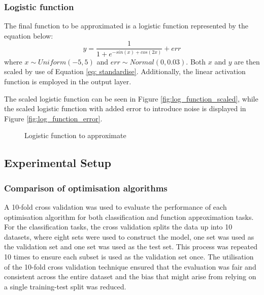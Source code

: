 \documentclass[10pt, conference]{IEEEtran}
\begin{document}
\subsubsection{Logistic function}

The final function to be approximated is a logistic function represented by the equation below:
\begin{equation}
    y = \frac{1}{1+e^{-sin(x)+cos(2x)}} + err \label{eq: third_approximation}
\end{equation}
where $x \sim Uniform(-5,5)$ and $err \sim Normal(0,0.03)$. Both $x$ and $y$ are then scaled by use
of Equation \ref{eq: standardise}. Additionally, the linear activation function is employed in the
output layer.

The scaled logistic function can be seen in Figure \ref{fig:log_function_scaled}, while the scaled logistic
function with added error to introduce noise is displayed in Figure \ref{fig:log_function_error}.
\begin{figure}[H]
    \centering
    \hfil
    \caption{Logistic function to approximate}
    \label{fig:log_function}
\end{figure}

\subsection{Experimental Setup} \label{section: experimental_setup_emp}

\subsubsection{Comparison of optimisation algorithms}
A 10-fold cross validation was used to evaluate the performance of each optimisation algorithm
for both classification and function approximation tasks. For the classification tasks, the cross validation
splits the data up into 10 datasets, where eight sets were used to construct the model, one set was used as the
validation set and one set was used as the test set. This process was repeated 10 times to ensure each subset is
used as the validation set once. The utilisation of the 10-fold cross validation technique ensured that the
evaluation was fair and consistent across the entire dataset and the bias that might arise from relying
on a single training-test split was reduced.
\end{document}
